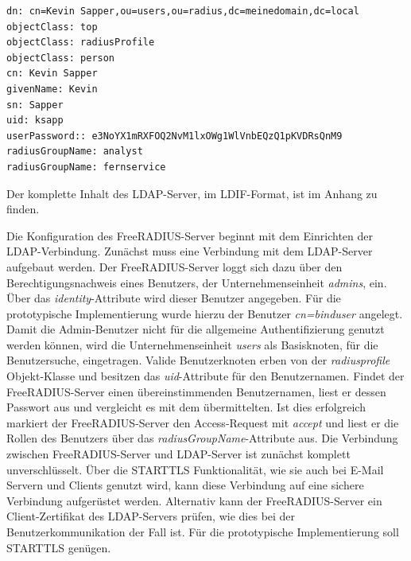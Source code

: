 \documentclass[11pt,a4paper]{report}
\begin{document}
\begin{lstlisting}[caption={Benutzerbeschreibung im LDIF-Format},label=lst:ldif_user]
dn: cn=Kevin Sapper,ou=users,ou=radius,dc=meinedomain,dc=local
objectClass: top
objectClass: radiusProfile
objectClass: person
cn: Kevin Sapper
givenName: Kevin
sn: Sapper
uid: ksapp
userPassword:: e3NoYX1mRXFOQ2NvM1lxOWg1WlVnbEQzQ1pKVDRsQnM9
radiusGroupName: analyst
radiusGroupName: fernservice
\end{lstlisting}

Der komplette Inhalt des LDAP-Server, im LDIF-Format, ist im Anhang zu finden. 

Die Konfiguration des FreeRADIUS-Server beginnt mit dem Einrichten der LDAP-Verbindung. Zunächst muss eine Verbindung mit dem LDAP-Server aufgebaut werden. Der FreeRADIUS-Server loggt sich dazu über den Berechtigungsnachweis eines Benutzers, der Unternehmenseinheit \textit{admins}, ein. Über das \textit{identity}-Attribute wird dieser Benutzer angegeben. Für die prototypische Implementierung wurde hierzu der Benutzer \textit{cn=binduser} angelegt. Damit die Admin-Benutzer nicht für die allgemeine Authentifizierung genutzt werden können, wird die Unternehmenseinheit \textit{users} als Basisknoten, für die Benutzersuche, eingetragen. Valide Benutzerknoten erben von der \textit{radiusprofile} Objekt-Klasse und besitzen das \textit{uid}-Attribute für den Benutzernamen. Findet der FreeRADIUS-Server einen übereinstimmenden Benutzernamen, liest er dessen Passwort aus und vergleicht es mit dem übermittelten. Ist dies erfolgreich markiert der FreeRADIUS-Server den Access-Request mit \textit{accept} und liest er die Rollen des Benutzers über das \textit{radiusGroupName}-Attribute aus. Die Verbindung zwischen FreeRADIUS-Server und LDAP-Server ist zunächst komplett unverschlüsselt. Über die STARTTLS Funktionalität, wie sie auch bei E-Mail Servern und Clients genutzt wird, kann diese Verbindung auf eine sichere Verbindung aufgerüstet werden. Alternativ kann der FreeRADIUS-Server ein Client-Zertifikat des LDAP-Servers prüfen, wie dies bei der Benutzerkommunikation der Fall ist. Für die prototypische Implementierung soll STARTTLS genügen.
\end{document}
